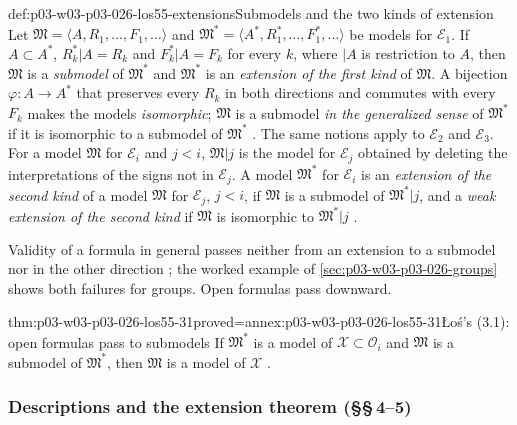 \begin{hbdefinition}{def:p03-w03-p03-026-los55-extensions}{Submodels and the two kinds of extension}
Let \(\mathfrak M=\langle A,R_1,\ldots,F_1,\ldots\rangle\) and
\(\mathfrak M^*=\langle A^*,R^*_1,\ldots,F^*_1,\ldots\rangle\) be models for
\(\mathcal E_1\).  If \(A\subset A^*\), \(R^*_k|A=R_k\) and \(F^*_k|A=F_k\)
for every \(k\), where \(|A\) is restriction to \(A\), then \(\mathfrak M\)
is a \emph{submodel} of \(\mathfrak M^*\) and \(\mathfrak M^*\) is an
\emph{extension of the first kind} of \(\mathfrak M\).  A bijection
\(\varphi\colon A\to A^*\) that preserves every \(R_k\) in both directions and
commutes with every \(F_k\) makes the models \emph{isomorphic}; \(\mathfrak M\)
is a submodel \emph{in the generalized sense} of \(\mathfrak M^*\) if it is
isomorphic to a submodel of \(\mathfrak M^*\) \cite[pp.~42--43]{Los1955}.
The same notions apply to \(\mathcal E_2\) and \(\mathcal E_3\).  For a model
\(\mathfrak M\) for \(\mathcal E_i\) and \(j<i\), \(\mathfrak M|j\) is the
model for \(\mathcal E_j\) obtained by deleting the interpretations of the
signs not in \(\mathcal E_j\).  A model \(\mathfrak M^*\) for \(\mathcal E_i\)
is an \emph{extension of the second kind} of a model \(\mathfrak M\) for
\(\mathcal E_j\), \(j<i\), if \(\mathfrak M\) is a submodel of
\(\mathfrak M^*|j\), and a \emph{weak extension of the second kind} if
\(\mathfrak M\) is isomorphic to \(\mathfrak M^*|j\)
\cite[p.~43]{Los1955}.
\end{hbdefinition}

Validity of a formula in general passes neither from an extension to a
submodel nor in the other direction \cite[p.~43]{Los1955}; the worked
example of \cref{sec:p03-w03-p03-026-groups} shows both failures for
groups.  Open formulas pass downward.

\begin{hblemma}{thm:p03-w03-p03-026-los55-31}{proved=annex:p03-w03-p03-026-los55-31}{\L o\'s's (3.1): open formulas pass to submodels}
If \(\mathfrak M^*\) is a model of \(\mathcal X\subset\mathcal O_i\) and
\(\mathfrak M\) is a submodel of \(\mathfrak M^*\), then \(\mathfrak M\) is a
model of \(\mathcal X\) \cite[p.~43]{Los1955}.
\end{hblemma}

\subsubsection{Descriptions and the extension theorem (\S\S\,4--5)}

